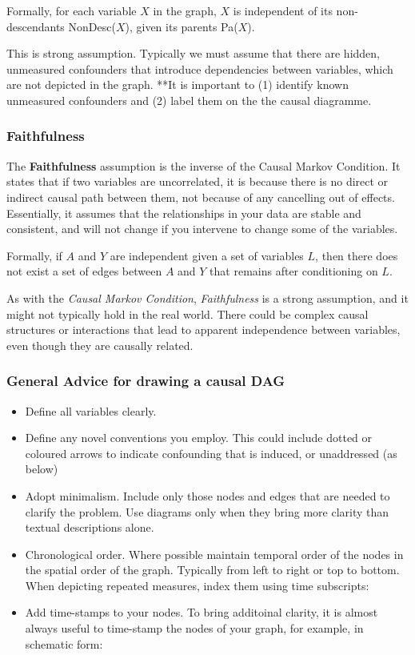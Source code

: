 \documentclass[
  singlecolumn]{report}
\providecommand{\tightlist}{%
  \setlength{\itemsep}{0pt}\setlength{\parskip}{0pt}}\usepackage{longtable,booktabs,array}
\begin{document}
Formally, for each variable \(X\) in the graph, \(X\) is independent of
its non-descendants NonDesc(\(X\)), given its parents Pa(\(X\)).

This is strong assumption. Typically we must assume that there are
hidden, unmeasured confounders that introduce dependencies between
variables, which are not depicted in the graph. **It is important to (1)
identify known unmeasured confounders and (2) label them on the the
causal diagramme.

\hypertarget{faithfulness}{%
\subsubsection{\texorpdfstring{\textbf{Faithfulness}}{Faithfulness}}\label{faithfulness}}

The \textbf{Faithfulness} assumption is the inverse of the Causal Markov
Condition. It states that if two variables are uncorrelated, it is
because there is no direct or indirect causal path between them, not
because of any cancelling out of effects. Essentially, it assumes that
the relationships in your data are stable and consistent, and will not
change if you intervene to change some of the variables.

Formally, if \(A\) and \(Y\) are independent given a set of variables
\(L\), then there does not exist a set of edges between \(A\) and \(Y\)
that remains after conditioning on \(L\).

As with the \emph{Causal Markov Condition}, \emph{Faithfulness} is a
strong assumption, and it might not typically hold in the real world.
There could be complex causal structures or interactions that lead to
apparent independence between variables, even though they are causally
related.

\hypertarget{general-advice-for-drawing-a-causal-dag}{%
\subsubsection{General Advice for drawing a causal
DAG}\label{general-advice-for-drawing-a-causal-dag}}

\begin{itemize}
\tightlist
\item
  Define all variables clearly.
\item
  Define any novel conventions you employ. This could include dotted or
  coloured arrows to indicate confounding that is induced, or
  unaddressed (as below)
\item
  Adopt minimalism. Include only those nodes and edges that are needed
  to clarify the problem. Use diagrams only when they bring more clarity
  than textual descriptions alone.
\item
  Chronological order. Where possible maintain temporal order of the
  nodes in the spatial order of the graph. Typically from left to right
  or top to bottom. When depicting repeated measures, index them using
  time subscripts:
\item
  Add time-stamps to your nodes. To bring additoinal clarity, it is
  almost always useful to time-stamp the nodes of your graph, for
  example, in schematic form:
\end{itemize}
\end{document}
